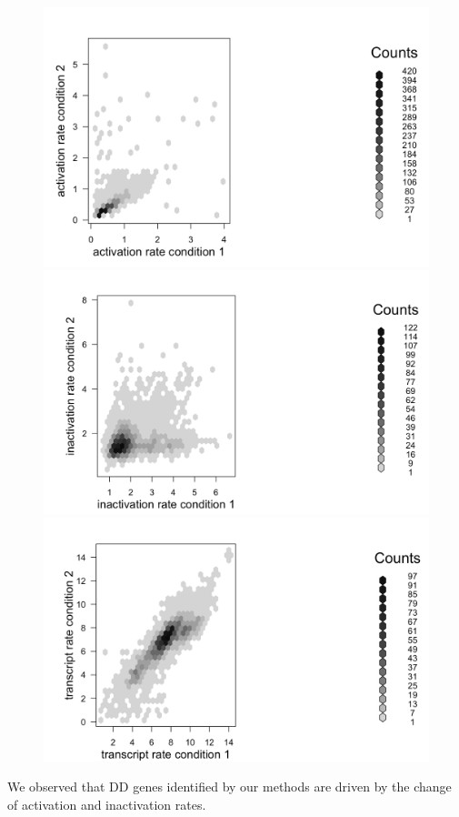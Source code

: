 \documentclass[11pt]{amsart}
\begin{document}
\begin{figure}[H]
  \includegraphics[width=\linewidth]{act.png}
  \caption{}
\endminipage\hfill
{}
  \includegraphics[width=\linewidth]{in_act.png}
  \caption{}
\endminipage\hfill
{}
  \includegraphics[width=\linewidth]{t_rate.png}
  \caption{}
  \endminipage
\end{figure}
We observed that DD genes identified by our methods are driven by the change of activation and inactivation rates. 
\end{document}
